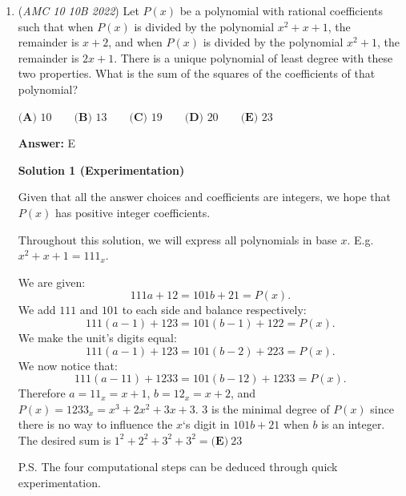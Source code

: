 \begin{enumerate}
 



\textbf{Solution 8 (educated guess)}

The answer choices must have something to do with 46. We can do some playing around, like trying $180 - 46 = 134$. Since the answers are all around the $110$s, we can start manipulating our $134$. We could divide by $2$, subtract $90$, etc. Dividing by $2$ gives $67$, and we can see $180 - 67 = 113$. However, we can also see that $180-((180-(90-46))/2) = 112$, but this seems much too complicated for a simple rhombus. Therefore, we can reasonably assume the answer is $\boxed{113}$. 

 


	\item (\textit{AMC 10 10B 2022}) Let $P(x)$ be a polynomial with rational coefficients such that when $P(x)$ is divided by the polynomial $x^2 + x + 1$, the remainder is $x + 2$, and when $P(x)$ is divided by the polynomial $x^2 + 1$, the remainder is $2x + 1$. There is a unique polynomial of least degree with these two properties. What is the sum of the squares of the coefficients of that polynomial?


 $\textbf{(A) } 10 \qquad \textbf{(B) } 13 \qquad \textbf{(C) } 19 \qquad \textbf{(D) } 20 \qquad \textbf{(E) } 23$

 \textbf{Answer: }E



\textbf{Solution 1 (Experimentation)}

Given that all the answer choices and coefficients are integers, we hope that $P(x)$ has positive integer coefficients.

 Throughout this solution, we will express all polynomials in base $x$. E.g. $x^2 + x + 1 = 111_{x}$.

 We are given:
 \[111a + 12 = 101b + 21 = P(x).\]We add $111$ and $101$ to each side and balance respectively:
 \[111(a - 1) + 123 = 101(b - 1) + 122 = P(x).\]We make the unit's digits equal:
 \[111(a - 1) + 123 = 101(b - 2) + 223 = P(x).\]We now notice that:
 \[111(a - 11) + 1233 = 101(b - 12) + 1233 = P(x).\]Therefore $a = 11_{x} = x + 1$, $b = 12_{x} = x + 2$, and $P(x) = 1233_{x} = x^3 + 2x^2 + 3x + 3$. $3$ is the minimal degree of $P(x)$ since there is no way to influence the $x$‘s digit in $101b + 21$ when $b$ is an integer. The desired sum is $1^2 + 2^2 +3^2+ 3^2 = \boxed{\textbf{(E)} \ 23}$

 P.S. The four computational steps can be deduced through quick experimentation.


\end{enumerate}
